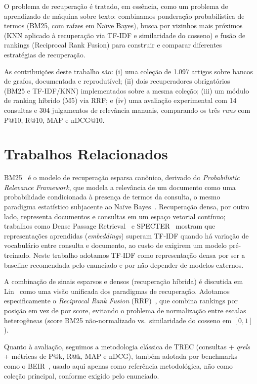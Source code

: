 \documentclass[12pt]{article}
\begin{document}
O problema de recuperação é tratado, em essência, como um problema de
aprendizado de máquina sobre texto: combinamos ponderação probabilística de
termos (BM25, com raízes em Naïve Bayes), busca por vizinhos mais próximos
(KNN aplicado à recuperação via TF-IDF e similaridade do cosseno) e fusão de
rankings (Reciprocal Rank Fusion) para construir e comparar diferentes
estratégias de recuperação.

As contribuições deste trabalho são: (i) uma coleção de 1.097 artigos sobre
bancos de grafos, documentada e reprodutível; (ii) dois recuperadores
obrigatórios (BM25 e TF-IDF/KNN) implementados sobre a mesma coleção; (iii)
um módulo de ranking híbrido (M5) via RRF; e (iv) uma avaliação experimental
com 14 consultas e 304 julgamentos de relevância manuais, comparando os três
\textit{runs} com P@10, R@10, MAP e nDCG@10.

\section{Trabalhos Relacionados}

BM25~\cite{robertson2009bm25} é o modelo de recuperação esparsa canônico,
derivado do \textit{Probabilistic Relevance Framework}, que modela a
relevância de um documento como uma probabilidade condicionada à presença de
termos da consulta, o mesmo paradigma estatístico subjacente ao Naïve
Bayes~\cite{manning2008ir}. Recuperação densa, por outro lado, representa
documentos e consultas em um espaço vetorial contínuo; trabalhos como Dense
Passage Retrieval~\cite{karpukhin2020dpr} e SPECTER~\cite{cohan2020specter}
mostram que representações aprendidas (\textit{embeddings}) superam TF-IDF
quando há variação de vocabulário entre consulta e documento, ao custo de
exigirem um modelo pré-treinado. Neste trabalho adotamos TF-IDF como
representação densa por ser a baseline recomendada pelo enunciado e por não
depender de modelos externos.

A combinação de sinais esparsos e densos (recuperação híbrida) é discutida em
Lin~\cite{lin2021framework} como uma visão unificada dos paradigmas de
recuperação. Adotamos especificamente o \textit{Reciprocal Rank Fusion}
(RRF)~\cite{cormack2009rrf}, que combina rankings por posição em vez de por
score, evitando o problema de normalização entre escalas heterogêneas (score
BM25 não-normalizado vs.\ similaridade do cosseno em $[0,1]$).

Quanto à avaliação, seguimos a metodologia clássica de TREC (consultas +
\textit{qrels} + métricas de P@k, R@k, MAP e nDCG), também adotada por
benchmarks como o BEIR~\cite{thakur2021beir}, usado aqui apenas como
referência metodológica, não como coleção principal, conforme exigido pelo
enunciado.
\end{document}
